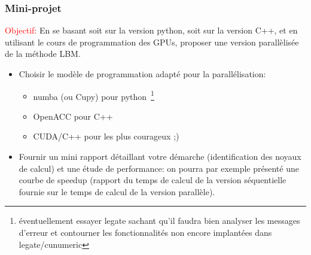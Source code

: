 \documentclass[utf8,usenames,dvipsnames,hyperref={pdfpagemode=FullScreen,urlcolor=blue}]{beamer}
\begin{document}
\begin{frame}
  \frametitle{Mini-projet}

  \textcolor{red}{Objectif:} En se basant soit sur la version python, soit sur la version C++, et en utilisant le cours de programmation des GPUs, proposer une version parallèlisée de la méthode LBM.

  \begin{itemize}
  \item Choisir le modèle de programmation adapté pour la parallélisation:
    \begin{itemize}
    \item numba (ou Cupy) pour python~\footnote{éventuellement essayer legate sachant qu'il faudra bien analyser les messages d'erreur et contourner les fonctionnalités non encore implantées dans legate/cunumeric}
    \item OpenACC pour C++
    \item CUDA/C++ pour les plus courageux ;)
    \end{itemize}
  \item Fournir un mini rapport détaillant votre démarche (identification des noyaux de calcul) et une étude de performance: on pourra par exemple présenté une courbe de speedup (rapport du temps de calcul de la version séquentielle fournie sur le temps de calcul de la version parallèle).
  \end{itemize}


\end{frame}
\end{document}

